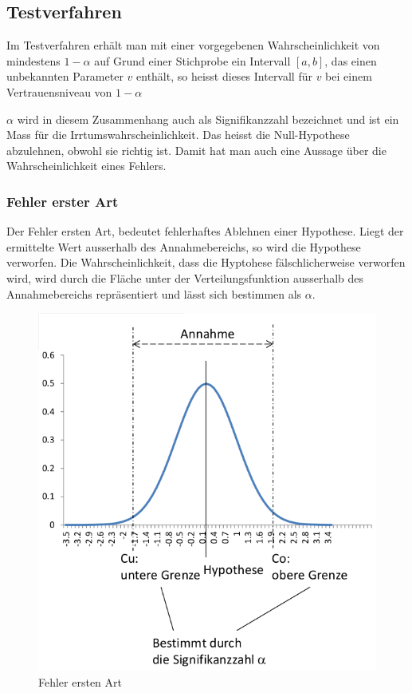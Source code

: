 \subsection{Testverfahren}
\begin{tcolorbox}[colback=green!5,colframe=green!40!black, title=Definition Testverfahren]
Im Testverfahren erhält man mit einer vorgegebenen Wahrscheinlichkeit von mindestens $1-\alpha$ auf Grund einer Stichprobe ein Intervall $[a,b]$, das einen unbekannten Parameter $v$ enthält, so heisst dieses Intervall für $v$ bei einem Vertrauensniveau von $1-\alpha$
\end{tcolorbox}
$\alpha$ wird in diesem Zusammenhang auch als Signifikanzzahl bezeichnet und ist ein Mass für die Irrtumswahrscheinlichkeit. Das heisst die Null-Hypothese abzulehnen, obwohl sie richtig ist. Damit hat man auch eine Aussage über die Wahrscheinlichkeit eines Fehlers.
\pagebreak[4]
\subsubsection{Fehler erster Art}
Der Fehler ersten Art, bedeutet fehlerhaftes Ablehnen einer Hypothese. Liegt der ermittelte Wert ausserhalb des Annahmebereichs, so wird die Hypothese verworfen. Die Wahrscheinlichkeit, dass die Hyptohese fälschlicherweise verworfen wird, wird durch die Fläche unter der Verteilungsfunktion ausserhalb des Annahmebereichs repräsentiert und lässt sich bestimmen als $\alpha$.
\begin{figure}[H]
\centering
\includegraphics[scale=0.25]{images/exev_testverfahren_fehlerart_1.png}
\caption{Fehler ersten Art}
\label{fig:testverfahren:fehler1}
\end{figure}
